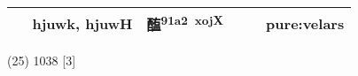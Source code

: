 \documentclass[14pt,a4paper]{scrartcl}
\begin{document}
\begin{longtable}[c]{@{}llllll@{}}
\begin{minipage}[t]{0.14\columnwidth}
𥁓
\strut\end{minipage} &
\begin{minipage}[t]{0.14\columnwidth}\raggedright\strut
hjuwk, hjuwH
\strut\end{minipage} &
\begin{minipage}[t]{0.14\columnwidth}\raggedright\strut
醢\textsuperscript{91a2~xojX}
\strut\end{minipage} &
\begin{minipage}[t]{0.14\columnwidth}\raggedright\strut
\strut\end{minipage} &
\begin{minipage}[t]{0.14\columnwidth}\raggedright\strut
\strut\end{minipage} &
\begin{minipage}[t]{0.14\columnwidth}\raggedright\strut
pure:velars
\strut\end{minipage}\tabularnewline
\bottomrule
\end{longtable}

(25) 1038 {[}3{]}
\end{document}
